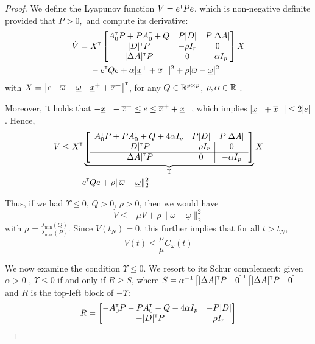 \begin{subappendices}
\begin{proof}
		We define the Lyapunov function $V = e^{\mathsf{\scriptscriptstyle T}} P e$, which is non-negative definite provided that
		$
		P>0,
		$ and compute its derivative:
		\begin{align*}
		\dot{V} ={}& X^{\mathsf{\scriptscriptstyle T}}
		\begin{bmatrix}
		A_0^{\mathsf{\scriptscriptstyle T}} P + P A_0^{\mathsf{\scriptscriptstyle T}} + Q & P|D| & P|\Delta A| \\
		|D|^{\mathsf{\scriptscriptstyle T}} P & -\rho I_r & 0\\
		|\Delta A|^{\mathsf{\scriptscriptstyle T}} P & 0 & -\alpha I_p
		\end{bmatrix}
		X\\
		& - e^{\mathsf{\scriptscriptstyle T}} Q e + \alpha |\underline{x}^+ + \overline{x}^-|^2 + \rho |\overline{\omega} - \underline{\omega}|^2
		\end{align*}
		with $X=\begin{bmatrix}
		e & \overline{\omega} - \underline{\omega} &  \underline{x}^+ + \overline{x}^-
		\end{bmatrix}^{\mathsf{\scriptscriptstyle T}}$, for any $Q\in\mathbb{R}^{p\times p}$, $\rho,\alpha\in\mathbb{R}$ . 
		
		Moreover, it holds that $-\underline{x}^+ -\overline{x}^- \leq e \leq \overline{x}^+ + \underline{x}^-$, which implies $|\underline{x}^+ + \overline{x}^-| \leq 2 |e|$. Hence,
		\begin{align*}
		\dot{V} \leq {}& X^{\mathsf{\scriptscriptstyle T}}
		\underbrace{
			\left[
			\begin{array}{cc|c}
			A_0^{\mathsf{\scriptscriptstyle T}} P + P A_0^{\mathsf{\scriptscriptstyle T}} + Q + 4\alpha I_p & P|D| & P|\Delta A| \\
			|D|^{\mathsf{\scriptscriptstyle T}} P & -\rho I_r & 0\\
			\hline
			|\Delta A|^{\mathsf{\scriptscriptstyle T}} P & 0 & -\alpha I_p
			\end{array}
			\right]}_{\Upsilon}
		X\\
		& - e^{\mathsf{\scriptscriptstyle T}} Q e + \rho \|\overline{\omega} - \underline{\omega}\|_2^2
		\end{align*}
		
		Thus, if we had $\Upsilon \leq 0$, $Q>0$, $\rho > 0$, then we would have
		\[
		\dot{V} \leq -\mu V + \rho \|\overline{\omega} - \underline{\omega}\|_2^2
		\]
		with $\mu = \frac{\lambda_{\min}(Q)}{\lambda_{\max}(P)}$. Since $V(t_N) = 0$, this further implies that for all $t>t_N$, 
		\begin{equation}
		\label{eq:lyap-bound}
		V(t) \leq \frac{\rho}{\mu} C_\omega(t)
		\end{equation}
		
		We now examine the condition $\Upsilon \leq 0$.
		We resort to its Schur complement: given $\alpha > 0$ , $\Upsilon \leq 0$ if and only if $R \geq S$, where $S= \alpha^{-1}\begin{bmatrix}|\Delta A|^{\mathsf{\scriptscriptstyle T}} P & 0\end{bmatrix}^{\mathsf{\scriptscriptstyle T}} \begin{bmatrix}|\Delta A|^{\mathsf{\scriptscriptstyle T}} P & 0\end{bmatrix}$ and $R$ is the top-left block of $-\Upsilon$:
		\[R = \begin{bmatrix}
		-A_0^{\mathsf{\scriptscriptstyle T}} P - P A_0^{\mathsf{\scriptscriptstyle T}} - Q - 4\alpha I_p & -P|D|\\
		-|D|^{\mathsf{\scriptscriptstyle T}} P & \rho I_r\\
		\end{bmatrix}\]
		

\end{proof}
\end{subappendices}
